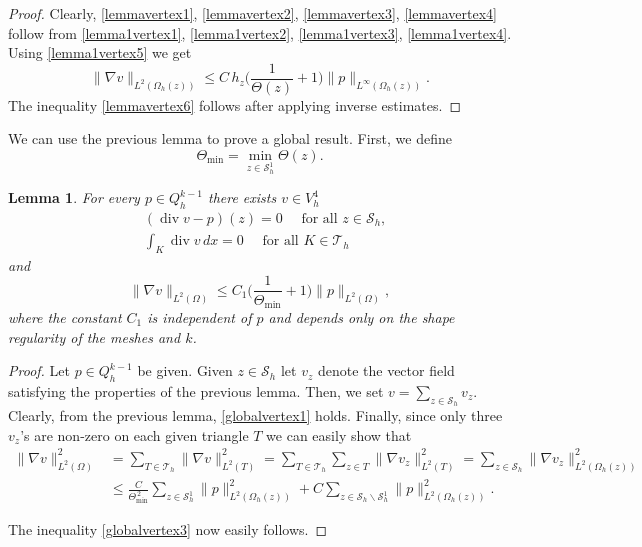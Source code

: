 \documentclass[11pt]{amsart}
\numberwithin{equation}{section}
\newcommand{\tmin}{\Theta_{\min}}
\newcommand{\Sh}{\mathcal{S}_h}
\newcommand{\dive}{\operatorname{div}}
\newcommand{\Th}{\mathcal{T}_h}
\newtheorem{lemma}{Lemma}
\theoremstyle{definition}
\begin{document}
\begin{proof}
Clearly, \eqref{lemmavertex1},  \eqref{lemmavertex2},  \eqref{lemmavertex3},  \eqref{lemmavertex4} follow from \eqref{lemma1vertex1},  \eqref{lemma1vertex2},  \eqref{lemma1vertex3},  \eqref{lemma1vertex4}. Using  \eqref{lemma1vertex5} we get
\begin{equation*}
\|\nabla v\|_{L^2(\Omega_h(z))} \le  C \, h_z \Big(\frac{1}{\Theta(z)}+1\Big) \|p\|_{L^\infty(\Omega_h(z))}. 
\end{equation*}
 The inequality \eqref{lemmavertex6} follows after applying inverse estimates. 

\end{proof}

We can use the previous lemma to prove a global result. First, we  define 
 \begin{equation*}
 \tmin= \min_{z \in \Sh^1} \Theta(z).
 \end{equation*}


\begin{lemma} \label{lemma2}
For every $p \in Q_h^{k-1}$ there exists $v \in V_h^4$
\begin{subequations}\label{globalvertex}
\begin{alignat}{1}
& (\dive v-p)(z)=0 \quad \text{ for all } z \in \Sh, \label{globalvertex1} \\
& \int_K \dive v \, dx=0 \quad \text{ for all } K \in \Th \label{globalvertex2} 
\end{alignat}
\end{subequations}
and
\begin{equation}\label{globalvertex3}
 \|\nabla v \|_{L^2(\Omega)} \le C_1\Big(\frac{1}{\tmin}+1\Big) \|p\|_{L^2(\Omega)},
\end{equation}
where the constant $C_1$ is independent of $p$ and depends only on the shape regularity of the meshes and $k$. 
\end{lemma}


\begin{proof}
Let $p \in Q_h^{k-1}$ be given. Given $z \in \Sh$ let $v_z$ denote  the vector field satisfying the properties of the previous lemma.  
Then, we set $v= \sum_{z \in \Sh} v_z$.  Clearly, from the previous lemma, \eqref{globalvertex1} holds. 
Finally, since only three $v_z$'s are non-zero on each given triangle $T$ we can easily show that 
\begin{equation*}
\begin{split}
\|\nabla v\|_{L^2(\Omega)}^2 &= \sum_{T\in\Th}\|\nabla v\|_{L^2(T)}^2 
 = \sum_{T\in\Th}\sum_{z \in T}\|\nabla v_z\|_{L^2(T)}^2 
 = \sum_{z \in \Sh} \| \nabla v_z \|_{L^2(\Omega_h(z))}^2 \\
&\le \frac{C}{\Theta_{\min}^{\,2}}  \sum_{  z \in \Sh^1} \|p\|_{L^2(\Omega_h(z))}^2+ C   \sum_{  z \in \Sh \backslash \Sh^1} \|p\|_{L^2(\Omega_h(z))}^2.
\end{split}
\end{equation*}

The inequality \eqref{globalvertex3} now easily follows.


\end{proof}
\end{document}
